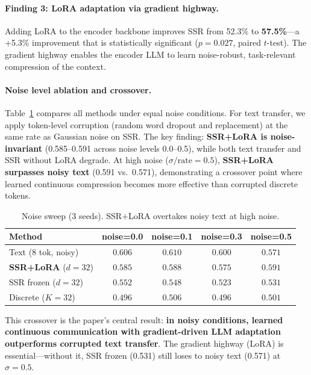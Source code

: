 \documentclass[11pt,a4paper]{article}
\begin{document}
\paragraph{Finding 3: LoRA adaptation via gradient highway.}
Adding LoRA to the encoder backbone improves SSR from 52.3\% to \textbf{57.5\%}---a +5.3\% improvement that is statistically significant ($p{=}0.027$, paired $t$-test). The gradient highway enables the encoder LLM to learn noise-robust, task-relevant compression of the context.

\paragraph{Noise level ablation and crossover.}
Table~\ref{tab:noise-sweep} compares all methods under equal noise conditions. For text transfer, we apply token-level corruption (random word dropout and replacement) at the same rate as Gaussian noise on SSR. The key finding: \textbf{SSR+LoRA is noise-invariant} (0.585--0.591 across noise levels 0.0--0.5), while both text transfer and SSR without LoRA degrade. At high noise ($\sigma/\text{rate}{=}0.5$), \textbf{SSR+LoRA surpasses noisy text} (0.591 vs.\ 0.571), demonstrating a crossover point where learned continuous compression becomes more effective than corrupted discrete tokens.

\begin{table}[h]
\centering
\caption{Noise sweep (3 seeds). SSR+LoRA overtakes noisy text at high noise.}
\label{tab:noise-sweep}
\vspace{0.3em}
\begin{tabular}{@{}lcccc@{}}
\toprule
\textbf{Method} & \textbf{noise=0.0} & \textbf{noise=0.1} & \textbf{noise=0.3} & \textbf{noise=0.5} \\
\midrule
Text (8 tok, noisy) & $0.606$ & $0.610$ & $0.600$ & $0.571$ \\
\textbf{SSR+LoRA} ($d{=}32$) & $0.585$ & $0.588$ & $0.575$ & $\mathbf{0.591}$ \\
SSR frozen ($d{=}32$) & $0.552$ & $0.548$ & $0.523$ & $0.531$ \\
Discrete ($K{=}32$) & $0.496$ & $0.506$ & $0.496$ & $0.501$ \\
\bottomrule
\end{tabular}
\end{table}

This crossover is the paper's central result: \textbf{in noisy conditions, learned continuous communication with gradient-driven LLM adaptation outperforms corrupted text transfer}. The gradient highway (LoRA) is essential---without it, SSR frozen (0.531) still loses to noisy text (0.571) at $\sigma{=}0.5$.
\end{document}
